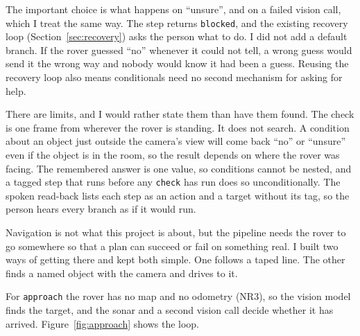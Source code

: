 The important choice is what happens on ``unsure'', and on a failed vision call,
which I treat the same way. The step returns \texttt{blocked}, and the existing
recovery loop (Section~\ref{sec:recovery}) asks the person what to do. I did not
add a default branch. If the rover guessed ``no'' whenever it could not tell, a
wrong guess would send it the wrong way and nobody would know it had been a guess.
Reusing the recovery loop also means conditionals need no second mechanism for
asking for help.

There are limits, and I would rather state them than have them found. The check is
one frame from wherever the rover is standing. It does not search. A condition
about an object just outside the camera's view will come back ``no'' or
``unsure'' even if the object is in the room, so the result depends on where the
rover was facing. The remembered answer is one value, so conditions cannot be
nested, and a tagged step that runs before any \texttt{check} has run does so
unconditionally. The spoken read-back lists each step as an action and a target
without its tag, so the person hears every branch as if it would run. %

\label{sec:navigation}

Navigation is not what this project is about, but the pipeline needs the rover to
go somewhere so that a plan can succeed or fail on something real. I built two
ways of getting there and kept both simple. One follows a taped line. The other
finds a named object with the camera and drives to it.

\label{ssec:freeroam}

For \texttt{approach} the rover has no map and no odometry (NR3), so the vision
model finds the target, and the sonar and a second vision call decide whether it
has arrived. Figure~\ref{fig:approach} shows the loop.

